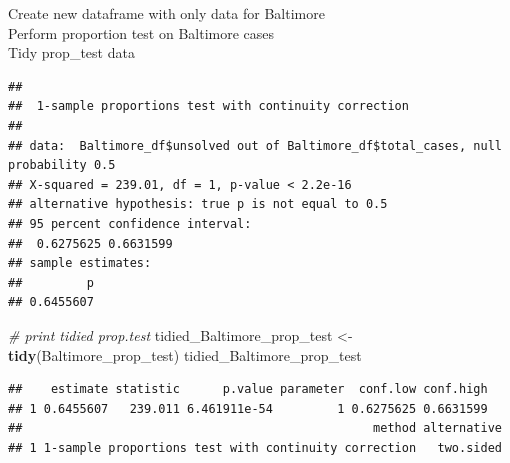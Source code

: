 \documentclass[]{article}
\newenvironment{Shaded}{\begin{snugshade}}{\end{snugshade}}
\newcommand{\CommentTok}[1]{\textcolor[rgb]{0.56,0.35,0.01}{\textit{#1}}}
\newcommand{\DataTypeTok}[1]{\textcolor[rgb]{0.13,0.29,0.53}{#1}}
\newcommand{\KeywordTok}[1]{\textcolor[rgb]{0.13,0.29,0.53}{\textbf{#1}}}
\newcommand{\NormalTok}[1]{#1}
\newcommand{\OperatorTok}[1]{\textcolor[rgb]{0.81,0.36,0.00}{\textbf{#1}}}
\newcommand{\StringTok}[1]{\textcolor[rgb]{0.31,0.60,0.02}{#1}}
\begin{document}
Create new dataframe with only data for Baltimore\\
Perform proportion test on Baltimore cases\\
Tidy prop\_test data

\begin{Shaded}
\end{Shaded}

\begin{verbatim}
## 
##  1-sample proportions test with continuity correction
## 
## data:  Baltimore_df$unsolved out of Baltimore_df$total_cases, null probability 0.5
## X-squared = 239.01, df = 1, p-value < 2.2e-16
## alternative hypothesis: true p is not equal to 0.5
## 95 percent confidence interval:
##  0.6275625 0.6631599
## sample estimates:
##         p 
## 0.6455607
\end{verbatim}

\begin{Shaded}
\begin{Highlighting}[]
\CommentTok{# print tidied prop.test}
\NormalTok{tidied_Baltimore_prop_test <-}\StringTok{ }\KeywordTok{tidy}\NormalTok{(Baltimore_prop_test)}
\NormalTok{tidied_Baltimore_prop_test}
\end{Highlighting}
\end{Shaded}

\begin{verbatim}
##    estimate statistic      p.value parameter  conf.low conf.high
## 1 0.6455607   239.011 6.461911e-54         1 0.6275625 0.6631599
##                                                 method alternative
## 1 1-sample proportions test with continuity correction   two.sided
\end{verbatim}

\begin{Shaded}
\end{Shaded}
\end{document}
